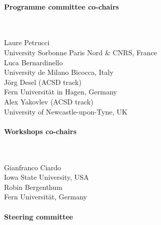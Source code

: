 \documentclass[10pt]{article}
\newcommand{\styleUniv}[1]{\textcolor{black!75}{#1}}
\begin{document}
\setlength{\columnsep}{0cm}
\begin{multicols}{2}
\paragraph{Programme committee co-chairs}$ $
\vspace*{0.25em}

\noindent Laure Petrucci \\
\indent \styleUniv{University Sorbonne Paris Nord \& CNRS, France} \\
\noindent Luca Bernardinello \\
\indent \styleUniv{University de Milano Bicocca, Italy} \\
\noindent Jörg Desel (ACSD track) \\
\indent \styleUniv{Fern Universität in Hagen, Germany} \\
\noindent Alex Yakovlev (ACSD track) \\
\indent \styleUniv{University of Newcastle-upon-Tyne, UK}

\paragraph*{Workshops co-chairs} $ $
\vspace*{0.25em}

\noindent Gianfranco Ciardo \\
\indent \styleUniv{Iowa State University, USA} \\
\noindent Robin Bergenthum \\
\indent \styleUniv{Fern Universität, Germany}



\columnbreak

\paragraph{Steering committee}\mbox{}
\vspace*{0.25em}


\end{multicols}
\end{document}
